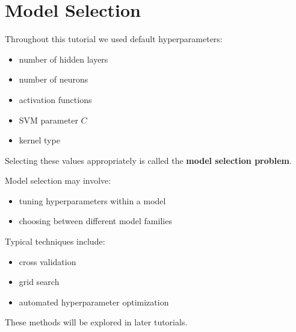 \documentclass[12pt]{article}
\begin{document}
\section{Model Selection}

Throughout this tutorial we used default hyperparameters:

\begin{itemize}
\item number of hidden layers
\item number of neurons
\item activation functions
\item SVM parameter $C$
\item kernel type
\end{itemize}

Selecting these values appropriately is called the \textbf{model selection problem}.

Model selection may involve:

\begin{itemize}
\item tuning hyperparameters within a model
\item choosing between different model families
\end{itemize}

Typical techniques include:

\begin{itemize}
\item cross validation
\item grid search
\item automated hyperparameter optimization
\end{itemize}

These methods will be explored in later tutorials.
\end{document}
